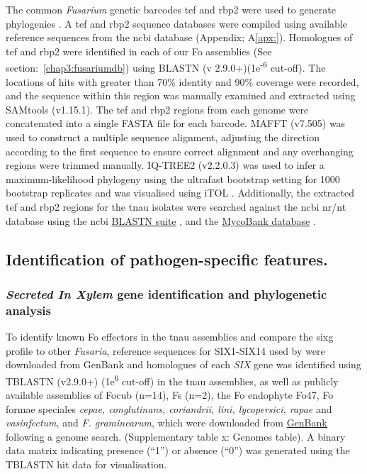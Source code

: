 The common \textit{Fusarium} genetic barcodes \ac{tef} and \ac{rbp2} were used to generate phylogenies \parencite{Edel-Hermann2019}. A \ac{tef} and \ac{rbp2} sequence databases were compiled using available reference sequences from the \ac{ncbi} database (Appendix; A\ref{apx:}). Homologues of \ac{tef} and \ac{rbp2} were identified in each of our \ac{Fo} assemblies (See section:~\ref{chap3:fusariumdb}) using BLASTN (v 2.9.0+)(1e\textsuperscript{-6} cut-off). The locations of hits with greater than 70\% identity and 90\% coverage were recorded, and the sequence within this region was manually examined and extracted using SAMtools (v1.15.1). The \ac{tef} and \ac{rbp2} regions from each genome were concatenated into a single FASTA file for each barcode. MAFFT (v7.505) \parencite{Katoh2019} was used to construct a multiple sequence alignment, adjusting the direction according to the first sequence to ensure correct alignment and any overhanging regions were trimmed manually. IQ-TREE2 (v2.2.0.3) \parencite{Nguyen2015} was used to infer a maximum-likelihood phylogeny using the ultrafast bootstrap setting for 1000 bootstrap replicates and was visualised using iTOL \parencite{Letunic2021}. Additionally, the extracted \ac{tef} and \ac{rbp2} regions for the \ac{tnau} isolates were searched against the \ac{ncbi} nr/nt database using the  \ac{ncbi} \href{https://blast.ncbi.nlm.nih.gov/Blast.cgi?PROGRAM=blastn&BLAST_SPEC=GeoBlast&PAGE_TYPE=BlastSearch}{BLASTN suite} \parencite{Nih2014}, and the \href{https://fusarium.mycobank.org/page/Fusarium_table}{MycoBank database} \parencite{Robert2013}. 

\subsection{Identification of pathogen-specific features.}

\subsubsection{\textit{Secreted In Xylem} gene identification and phylogenetic analysis}
\label{chap1:tnauSIXgenePhylo}
To identify known \acs{Fo} effectors in the \ac{tnau} assemblies and compare the \ac{sixg} profile to other \textit{Fusaria}, reference sequences for SIX1-SIX14 used by \textcite{Czislowski2018} were downloaded from  GenBank and homologues of each \textit{SIX} gene was identified using TBLASTN (v2.9.0+) (1e\textsuperscript{6} cut-off) in the \ac{tnau} assemblies, as well as publicly available assemblies of \ac{Focub} (n=14), \ac{Fs} (n=2), the \ac{Fo} endophyte Fo47, \ac{Fo} formae speciales \textit{cepae, conglutinans, coriandrii, lini, lycopersici,  rapae} and \textit{vasinfectum}, and \textit{F. graminearum}, which were downloaded from \href{https://www.ncbi.nlm.nih.gov/data-hub/genome/}{GenBank} following a genome search. (Supplementary table x: Genomes table). A binary data matrix indicating presence (“1”) or absence (“0”) was generated using the TBLASTN hit data for visualisation. 


